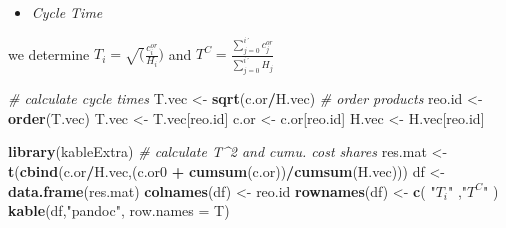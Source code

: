 \documentclass[
]{article}
\newenvironment{Shaded}{\begin{snugshade}}{\end{snugshade}}
\newcommand{\CommentTok}[1]{\textcolor[rgb]{0.56,0.35,0.01}{\textit{#1}}}
\newcommand{\DataTypeTok}[1]{\textcolor[rgb]{0.13,0.29,0.53}{#1}}
\newcommand{\KeywordTok}[1]{\textcolor[rgb]{0.13,0.29,0.53}{\textbf{#1}}}
\newcommand{\NormalTok}[1]{#1}
\newcommand{\OperatorTok}[1]{\textcolor[rgb]{0.81,0.36,0.00}{\textbf{#1}}}
\newcommand{\StringTok}[1]{\textcolor[rgb]{0.31,0.60,0.02}{#1}}
\providecommand{\tightlist}{%
  \setlength{\itemsep}{0pt}\setlength{\parskip}{0pt}}
\begin{document}
\begin{itemize}
\tightlist
\item
  \emph{Cycle Time}
\end{itemize}

we determine \(T_i=\sqrt (\frac {c_i^{or}}{H_i})\) and
\(T^C=\frac {\sum_{j=0}^{i´} c_j^{or}}{\sum_{j=0}^{i´}H_j}\)

\begin{Shaded}
\begin{Highlighting}[]
\CommentTok{# calculate cycle times}
\NormalTok{T.vec <-}\StringTok{ }\KeywordTok{sqrt}\NormalTok{(c.or}\OperatorTok{/}\NormalTok{H.vec)}
\CommentTok{# order products}
\NormalTok{reo.id <-}\StringTok{ }\KeywordTok{order}\NormalTok{(T.vec)}
\NormalTok{T.vec <-}\StringTok{ }\NormalTok{T.vec[reo.id]}
\NormalTok{c.or <-}\StringTok{ }\NormalTok{c.or[reo.id]}
\NormalTok{H.vec <-}\StringTok{ }\NormalTok{H.vec[reo.id]}
\end{Highlighting}
\end{Shaded}

\begin{Shaded}
\begin{Highlighting}[]
\KeywordTok{library}\NormalTok{(kableExtra)}
\CommentTok{# calculate T^2 and cumu. cost shares}
\NormalTok{res.mat <-}\StringTok{ }\KeywordTok{t}\NormalTok{(}\KeywordTok{cbind}\NormalTok{(c.or}\OperatorTok{/}\NormalTok{H.vec,(c.or0 }\OperatorTok{+}\StringTok{ }\KeywordTok{cumsum}\NormalTok{(c.or))}\OperatorTok{/}\KeywordTok{cumsum}\NormalTok{(H.vec)))}
\NormalTok{df <-}\StringTok{ }\KeywordTok{data.frame}\NormalTok{(res.mat)}
\KeywordTok{colnames}\NormalTok{(df) <-}\StringTok{ }\NormalTok{reo.id }
\KeywordTok{rownames}\NormalTok{(df) <-}\StringTok{ }\KeywordTok{c}\NormalTok{(  }\StringTok{"$T_i$"}\NormalTok{ ,}\StringTok{"$T^C$"}\NormalTok{  )}
\KeywordTok{kable}\NormalTok{(df,}\StringTok{"pandoc"}\NormalTok{, }\DataTypeTok{row.names =}\NormalTok{ T)}
\end{Highlighting}
\end{Shaded}
\end{document}
